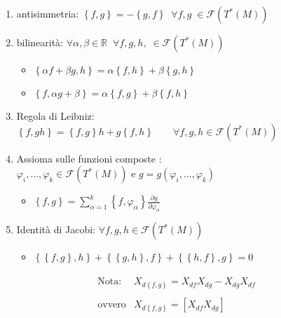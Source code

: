 \begin{enumerate}
\item antisimmetria: $\left\lbrace f,g \right\rbrace = - \left\lbrace g,f \right\rbrace \; \; \forall f,g \; \in \mathcal{F} (T^* (M))$
\item bilinearità: $\forall \alpha, \beta \in \mathbb{R} \; \; \forall f, g, h, \; \in \mathcal{F} (T^* (M))$
				\begin{itemize}
				\item[] $\left\lbrace \alpha f+\beta g, h\right\rbrace= \alpha \left\lbrace f,h\right\rbrace + \beta \left\lbrace g,h \right\rbrace$
				\item[] $\left\lbrace f,\alpha g + \beta \right\rbrace= \alpha \left\lbrace f,g\right\rbrace + \beta \left\lbrace f,h \right\rbrace$ \\ 
				\end{itemize}
\item Regola di Leibniz: $\left\lbrace f, g h \right\rbrace = \left\lbrace f, g \right\rbrace h + g \left\lbrace f, h \right\rbrace \qquad \forall f, g, h \in \mathcal{F} (T^* (M))$
\item Assioma sulle funzioni composte \label{pag:assioma_funz_comp} : $ \varphi_{i}, \dots , \varphi_{k} \in \mathcal{F} (T^* (M)) \text{ e } g = g (\varphi_{i}, \dots , \varphi_{k}) $ 
\begin{itemize} \item[]$\left\lbrace f,g \right\rbrace =  \sum_{\alpha = 1}^{k} \left\lbrace f,\varphi_{\alpha} \right\rbrace \frac{\partial g}{\partial \varphi_{\alpha}}$
\end{itemize}
\item Identità di Jacobi: $ \forall f, g, h \in \mathcal{F} (T^* (M)) $
\begin{itemize}
\item[] $ \left\lbrace \left\lbrace f, g \right\rbrace , h \right\rbrace + \left\lbrace \left\lbrace g, h \right\rbrace , f \right\rbrace + \left\lbrace \left\lbrace h, f \right\rbrace, g \right\rbrace = 0 $
\end{itemize}
\end{enumerate}

\begin{align*}
\begin{array}{cc}
\text{Nota:}  &X_{d\left\lbrace f,g \right\rbrace} = X_{df} X_{dg} - X_{dg} X_{df}
\\
\\
\text{ovvero} &X_{d\left\lbrace f,g \right\rbrace} = \left [ X_{df}X_{dg} \right]
\end{array}
\end{align*}
